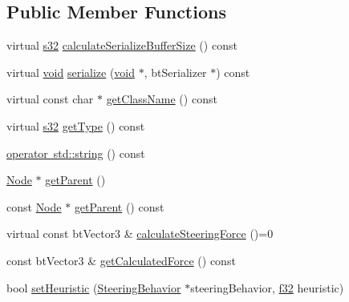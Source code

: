 \subsection*{Public Member Functions}
\begin{DoxyCompactItemize}
\item 
virtual \mbox{\hyperlink{_util_8h_aa62c75d314a0d1f37f79c4b73b2292e2}{s32}} \mbox{\hyperlink{classnjli_1_1_steering_behavior_machine_af6540438929773c0376faff7c1f908c0}{calculate\+Serialize\+Buffer\+Size}} () const
\item 
virtual \mbox{\hyperlink{_thread_8h_af1e856da2e658414cb2456cb6f7ebc66}{void}} \mbox{\hyperlink{classnjli_1_1_steering_behavior_machine_a1fbec43b76f0612ed5b0d2492bb4b6df}{serialize}} (\mbox{\hyperlink{_thread_8h_af1e856da2e658414cb2456cb6f7ebc66}{void}} $\ast$, bt\+Serializer $\ast$) const
\item 
virtual const char $\ast$ \mbox{\hyperlink{classnjli_1_1_steering_behavior_machine_a62b8ba5c3e2b9f63eb146721c03d37a1}{get\+Class\+Name}} () const
\item 
virtual \mbox{\hyperlink{_util_8h_aa62c75d314a0d1f37f79c4b73b2292e2}{s32}} \mbox{\hyperlink{classnjli_1_1_steering_behavior_machine_a9daddfcf84380483cd2643c15d0497a4}{get\+Type}} () const
\item 
\mbox{\hyperlink{classnjli_1_1_steering_behavior_machine_a08dc60d265fe55badc0137c1a4427343}{operator std\+::string}} () const
\item 
\mbox{\hyperlink{classnjli_1_1_node}{Node}} $\ast$ \mbox{\hyperlink{classnjli_1_1_steering_behavior_machine_aa140509a8a5dcf389594c014ef1e779b}{get\+Parent}} ()
\item 
const \mbox{\hyperlink{classnjli_1_1_node}{Node}} $\ast$ \mbox{\hyperlink{classnjli_1_1_steering_behavior_machine_ab60292961503180cfb1f67e04f6a3dd4}{get\+Parent}} () const
\item 
virtual const bt\+Vector3 \& \mbox{\hyperlink{classnjli_1_1_steering_behavior_machine_aea431466acb4ef73220206bbcd515a9a}{calculate\+Steering\+Force}} ()=0
\item 
const bt\+Vector3 \& \mbox{\hyperlink{classnjli_1_1_steering_behavior_machine_a7d757fe3a0e36bcd3606f660025e1529}{get\+Calculated\+Force}} () const
\item 
bool \mbox{\hyperlink{classnjli_1_1_steering_behavior_machine_afeba19775abc7b530aa0997e1e8cad9c}{set\+Heuristic}} (\mbox{\hyperlink{classnjli_1_1_steering_behavior}{Steering\+Behavior}} $\ast$steering\+Behavior, \mbox{\hyperlink{_util_8h_a5f6906312a689f27d70e9d086649d3fd}{f32}} heuristic)

\end{DoxyCompactItemize}
